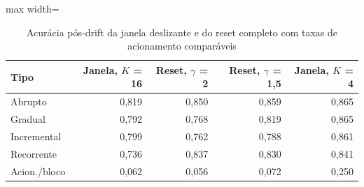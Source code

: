 \begin{table}[htbp]
\centering
\small
\caption{Acurácia pós-drift da janela deslizante e do reset completo com taxas de acionamento comparáveis}
\label{tab:orcamento}
\begin{adjustbox}{max width=\textwidth}
\begin{tabular}{lrrrr}
\toprule
Tipo & Janela, $K$ = 16 & Reset, $\gamma$ = 2 & Reset, $\gamma$ = 1,5 & Janela, $K$ = 4 \\
\midrule
Abrupto & 0,819 & 0,850 & 0,859 & 0,865 \\
Gradual & 0,792 & 0,768 & 0,819 & 0,865 \\
Incremental & 0,799 & 0,762 & 0,788 & 0,861 \\
Recorrente & 0,736 & 0,837 & 0,830 & 0,841 \\
Acion./bloco & 0,062 & 0,056 & 0,072 & 0,250 \\
\bottomrule
\end{tabular}
\end{adjustbox}
\par\vspace{2pt}{\footnotesize Dados da análise de sensibilidade (5 repetições). A última linha traz a taxa média de acionamento de cada configuração.}
\end{table}
